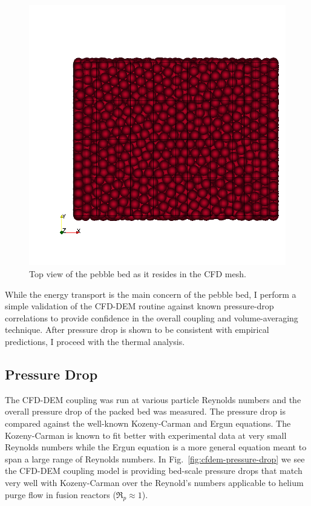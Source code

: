 \begin{figure}[t]
	\centering
	\includegraphics[width=\singleimagewidth]{figures/z-top-view}
    \caption{Top view of the pebble bed as it resides in the CFD mesh.}\label{fig:cfdem-domain-z}
\end{figure}


While the energy transport is the main concern of the pebble bed, I perform a simple validation of the CFD-DEM routine against known pressure-drop correlations to provide confidence in the overall coupling and volume-averaging technique. After pressure drop is shown to be consistent with empirical predictions, I proceed with the thermal analysis.
\FloatBarrier


\subsection{Pressure Drop}

The CFD-DEM coupling was run at various particle Reynolds numbers and the overall pressure drop of the packed bed was measured. The pressure drop is compared against the well-known Kozeny-Carman and Ergun equations. The Kozeny-Carman is known to fit better with experimental data at very small Reynolds numbers while the Ergun equation is a more general equation meant to span a large range of Reynolds numbers. In Fig.~\ref{fig:cfdem-pressure-drop} we see the CFD-DEM coupling model is providing bed-scale pressure drops that match very well with Kozeny-Carman over the Reynold’s numbers applicable to helium purge flow in fusion reactors ($\Re_p \approx 1$). 

